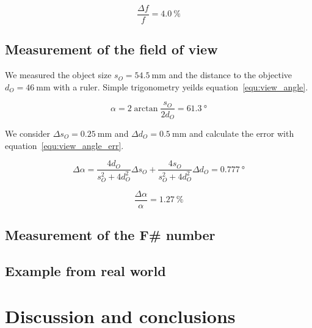 \documentclass[a4paper, 12pt]{paper}
\begin{document}
\begin{equation}
    \frac{\Delta f}{f} = \SI{4.0}{\percent}
    \label{equ:focal_length_err_percent}
\end{equation}

\subsection{Measurement of the field of view}
We measured the object size $s_O = \SI{54.5}{\milli\meter}$ and the distance to the objective $d_O = \SI{46}{\milli\meter}$ with a ruler.
Simple trigonometry yeilds equation~\ref{equ:view_angle}.

\begin{equation}
    \alpha = 2 \arctan{\frac{s_O}{2 d_O}} = \SI{61.3}{\degree}
    \label{equ:view_angle}
\end{equation}

We consider $\Delta s_O = \SI{0.25}{\milli\meter}$ and $\Delta d_O = \SI{0.5}{\milli\meter}$ and calculate the error with equation~\ref{equ:view_angle_err}.

\begin{equation}
    \Delta \alpha = \frac{4 d_O}{s_O^2 + 4 d_O^2} \Delta s_O
    + \frac{4 s_O}{s_O^2 + 4 d_O^2} \Delta d_O = \SI{0.777}{\degree}
    \label{equ:view_angle_err}
\end{equation}

\begin{equation}
    \frac{\Delta \alpha}{\alpha} = \SI{1.27}{\percent}
    \label{equ:view_angle_err_percent}
\end{equation}

\subsection{Measurement of the F\# number}
\subsection{Example from real world}


\section{Discussion and conclusions}
\lipsum[6]
\end{document}
